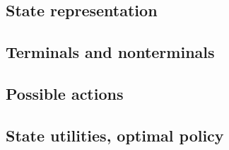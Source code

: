 \documentclass[letterpaper, 10pt, twocolumn]{article}
\begin{document}
\subsection{State representation}

\subsection{Terminals and nonterminals}

\subsection{Possible actions}

\subsection{State utilities, optimal policy}

\end{document}
